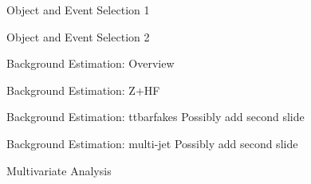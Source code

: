 \documentclass[11pt, xcolor={dvipsnames}, aspectratio=169]{beamer}
\begin{document}
\begin{frame}{Object and Event Selection 1}
\end{frame}


\begin{frame}{Object and Event Selection 2}
\end{frame}


\begin{frame}{Background Estimation: Overview}
\end{frame}


\begin{frame}{Background Estimation: Z+HF}
\end{frame}


\begin{frame}{Background Estimation: ttbarfakes}
  Possibly add second slide
\end{frame}


\begin{frame}{Background Estimation: multi-jet}
  Possibly add second slide
\end{frame}


\begin{frame}{Multivariate Analysis}
\end{frame}

\end{document}
